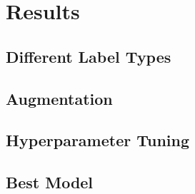 


\section{Results}
\label{results}

\subsection{Different Label Types}%


\subsection{Augmentation}%


\subsection{Hyperparameter Tuning}%


\subsection{Best Model}%